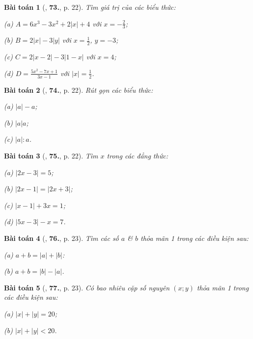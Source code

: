 \documentclass{article}
\numberwithin{equation}{section}
\newtheorem{baitoan}{Bài toán}[section]
\begin{document}
\begin{baitoan}[\cite{Binh_Toan_7_tap_1}, \textbf{73.}, p. 22]
	Tìm giá trị của các biểu thức:
	\begin{enumerate*}
		\item[(a)] $A = 6x^3 - 3x^2 + 2|x| + 4$ với $x = -\frac{2}{3}$;
		\item[(b)] $B = 2|x| - 3|y|$ với $x = \frac{1}{2}$, $y = -3$;
		\item[(c)] $C = 2|x - 2| - 3|1 - x|$ với $x = 4$;
		\item[(d)] $D = \frac{5x^2 - 7x + 1}{3x - 1}$ với $|x| = \frac{1}{2}$.
	\end{enumerate*}
\end{baitoan}

\begin{baitoan}[\cite{Binh_Toan_7_tap_1}, \textbf{74.}, p. 22]
	Rút gọn các biểu thức:
	\begin{enumerate*}
		\item[(a)] $|a| - a$;
		\item[(b)] $|a|a$;
		\item[(c)] $|a|:a$.
	\end{enumerate*}
\end{baitoan}

\begin{baitoan}[\cite{Binh_Toan_7_tap_1}, \textbf{75.}, p. 22]
	Tìm $x$ trong các đẳng thức:
	\begin{enumerate*}
		\item[(a)] $|2x - 3| = 5$;
		\item[(b)] $|2x - 1| = |2x + 3|$;
		\item[(c)] $|x - 1| + 3x = 1$;
		\item[(d)] $|5x - 3| - x = 7$.
	\end{enumerate*}
\end{baitoan}

\begin{baitoan}[\cite{Binh_Toan_7_tap_1}, \textbf{76.}, p. 23]
	Tìm các số $a$ \& $b$ thỏa mãn 1 trong các điều kiện sau:
	\begin{enumerate*}
		\item[(a)] $a + b = |a| + |b|$:
		\item[(b)] $a + b = |b| - |a|$.
	\end{enumerate*}
\end{baitoan}

\begin{baitoan}[\cite{Binh_Toan_7_tap_1}, \textbf{77.}, p. 23]
	Có bao nhiêu cặp số nguyên $(x;y)$ thỏa mãn 1 trong các điều kiện sau:
	\begin{enumerate*}
		\item[(a)] $|x| + |y| = 20$;
		\item[(b)] $|x| + |y| < 20$.
	\end{enumerate*}
\end{baitoan}
\end{document}
